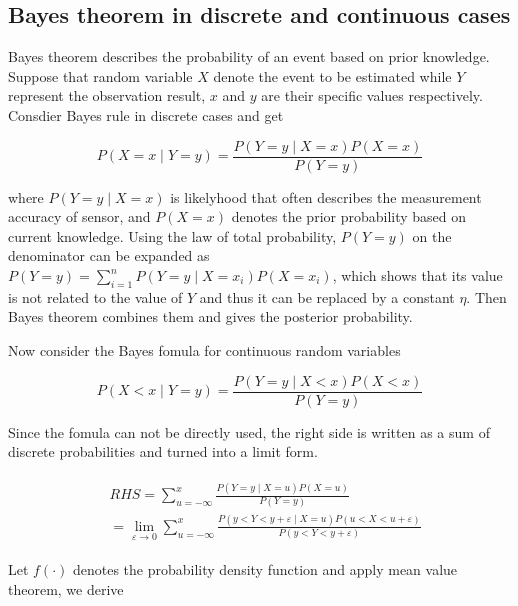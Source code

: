 \documentclass[conference]{IEEEtran}
\begin{document}
	\subsection{Bayes theorem in discrete and continuous cases}
	
	Bayes theorem describes the probability of an event based on prior knowledge. Suppose that random variable $X$ denote the event to be estimated while $Y$ represent the observation result, $x$ and $y$ are their specific values respectively. Consdier Bayes rule in discrete cases and get
	
	\begin{equation}
		P(X=x\mid Y=y)=\frac{P(Y=y\mid X=x)P(X=x)}{P(Y=y)}
		\label{eq1}
	\end{equation}
	
	where $P(Y=y\mid X=x)$ is likelyhood that often describes the measurement accuracy of sensor, and $P(X=x)$ denotes the prior probability based on current knowledge. Using the law of total probability, $P(Y=y)$ on the denominator can be expanded as $P(Y=y)=\sum_{i=1}^{n}P(Y=y \mid X=x_{i})P(X=x_{i})$, which shows that its value is not related to the value of $Y$ and thus it can be replaced by a constant $\eta $. Then Bayes theorem combines them and gives the posterior probability.
	
	Now consider the Bayes fomula for continuous random variables
	
	\begin{equation}
	P(X<x\mid Y=y)=\frac{P(Y=y\mid X<x)P(X<x)}{P(Y=y)}
	\label{eq2}
	\end{equation}
	
	Since the fomula can not be directly used, the right side is written as a sum of discrete probabilities and turned into a limit form. 
	
	\begin{equation}
	\begin{split}
	\begin{aligned}
	&RHS=\sum_{u=-\infty}^{x}\frac{P(Y=y\mid X=u)P(X=u)}{P(Y=y)}
	\\
	&=\lim_{\varepsilon \rightarrow 0}\sum_{u=-\infty}^{x}\frac{P(y<Y<y+\varepsilon \mid X=u)P(u<X<u+\varepsilon )}{P(y<Y<y+\varepsilon )}
	\nonumber
	\end{aligned}
	\end{split}
	\end{equation}
	
	Let $f(\cdot )$ denotes the probability density function and apply mean value theorem, we derive
	
\end{document}
